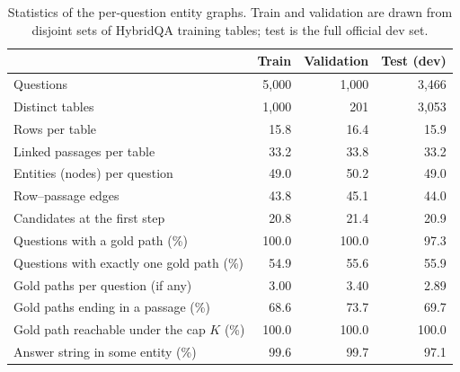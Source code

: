 \begin{table}[t]
\centering
\small
\caption{Statistics of the per-question entity graphs. Train and validation are drawn from disjoint sets of HybridQA training tables; test is the full official dev set.}
\label{tab:datastats}
\begin{tabular}{@{}lrrr@{}}
\toprule
 & Train & Validation & Test (dev) \\
\midrule
Questions & 5,000 & 1,000 & 3,466 \\
Distinct tables & 1,000 & 201 & 3,053 \\
Rows per table & 15.8 & 16.4 & 15.9 \\
Linked passages per table & 33.2 & 33.8 & 33.2 \\
Entities (nodes) per question & 49.0 & 50.2 & 49.0 \\
Row--passage edges & 43.8 & 45.1 & 44.0 \\
Candidates at the first step & 20.8 & 21.4 & 20.9 \\
Questions with a gold path (\%) & 100.0 & 100.0 & 97.3 \\
Questions with exactly one gold path (\%) & 54.9 & 55.6 & 55.9 \\
Gold paths per question (if any) & 3.00 & 3.40 & 2.89 \\
Gold paths ending in a passage (\%) & 68.6 & 73.7 & 69.7 \\
Gold path reachable under the cap $K$ (\%) & 100.0 & 100.0 & 100.0 \\
Answer string in some entity (\%) & 99.6 & 99.7 & 97.1 \\
\bottomrule
\end{tabular}
\end{table}
